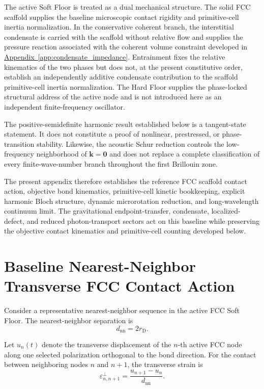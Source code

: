 The active Soft Floor is treated as a dual mechanical structure. The solid FCC scaffold supplies the baseline microscopic contact rigidity and primitive-cell inertia normalization. In the conservative coherent branch, the interstitial condensate is carried with the scaffold without relative flow and supplies the pressure reaction associated with the coherent volume constraint developed in \hyperref[app:condensate_impedance]{Appendix~\ref*{app:condensate_impedance}}. Entrainment fixes the relative kinematics of the two phases but does not, at the present constitutive order, establish an independently additive condensate contribution to the scaffold primitive-cell inertia normalization. The Hard Floor supplies the phase-locked structural address of the active node and is not introduced here as an independent finite-frequency oscillator.

The positive-semidefinite harmonic result established below is a tangent-state statement. It does not constitute a proof of nonlinear, prestressed, or phase-transition stability. Likewise, the acoustic Schur reduction controls the low-frequency neighborhood of $\mathbf{k}=\mathbf{0}$ and does not replace a complete classification of every finite-wave-number branch throughout the first Brillouin zone.

The present appendix therefore establishes the reference FCC scaffold contact action, objective bond kinematics, primitive-cell kinetic bookkeeping, explicit harmonic Bloch structure, dynamic microrotation reduction, and long-wavelength continuum limit. The gravitational endpoint-transfer, condensate, localized-defect, and reduced photon-transport sectors act on this baseline while preserving the objective contact kinematics and primitive-cell counting developed below.


\section{Baseline Nearest-Neighbor Transverse FCC Contact Action}
\label{sec:fcc_baseline_transverse_action}

Consider a representative nearest-neighbor sequence in the active FCC Soft Floor. The nearest-neighbor separation is
\begin{equation}
    d_{\mathrm{nn}} = 2r_{\mathrm{D}}.
\end{equation}

Let $u_n(t)$ denote the transverse displacement of the $n$-th active FCC node along one selected polarization orthogonal to the bond direction. For the contact between neighboring nodes $n$ and $n+1$, the transverse strain is
\begin{equation}
    \varepsilon_{n,n+1}^{\perp} = \frac{u_{n+1}-u_n}{d_{\mathrm{nn}}}.
\end{equation}

